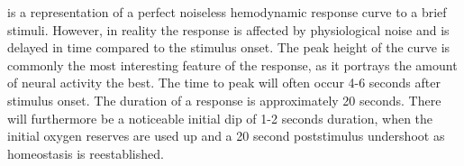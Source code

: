  is a representation of a perfect noiseless hemodynamic response curve to a brief stimuli. However, in reality the response is affected by physiological noise and is delayed in time compared to the stimulus onset. The peak height of the curve is commonly the most interesting feature of the response, as it portrays the amount of neural activity the best. The time to peak will often occur 4-6 seconds after stimulus onset. The duration of a response is approximately 20 seconds. There will furthermore be a noticeable initial dip of 1-2 seconds duration, when the initial oxygen reserves are used up and a 20 second poststimulus undershoot as homeostasis is reestablished. \cite{Poldrack2011}   